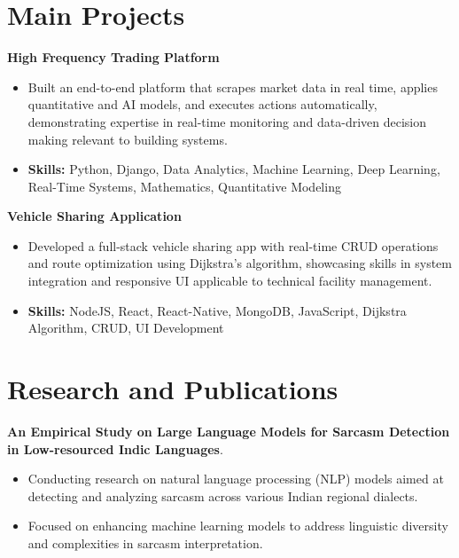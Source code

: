\documentclass[a4paper,11pt]{article}
\begin{document}
\section{\textbf{Main Projects}}

\vspace{1mm}
  \textbf{High Frequency Trading Platform  }
\vspace{-1.5mm} %
\begin{itemize}
  \item Built an end-to-end platform that scrapes market data in real time, applies quantitative and AI models, and executes actions automatically, demonstrating expertise in real-time monitoring and data-driven decision making relevant to building systems.
\vspace{-3mm}
  \item \textbf{Skills:} Python, Django, Data Analytics, Machine Learning, Deep Learning, Real-Time Systems, Mathematics, Quantitative Modeling
\end{itemize}


\vspace{1mm}
   \textbf{Vehicle Sharing Application }
\vspace{-1.5mm} %
\begin{itemize}
  \item Developed a full-stack vehicle sharing app with real-time CRUD operations and route optimization using Dijkstra's algorithm, showcasing skills in system integration and responsive UI applicable to technical facility management.
\vspace{-3mm}
  \item \textbf{Skills:} NodeJS, React, React-Native, MongoDB, JavaScript, Dijkstra Algorithm, CRUD, UI Development
\end{itemize}



\section{\textbf{Research and Publications} \hfill }
\vspace{1mm}
  \textbf{An Empirical Study on Large Language Models for Sarcasm Detection in Low-resourced Indic Languages}.
\vspace{-1mm} %
\begin{itemize}
  \item Conducting research on natural language processing (NLP) models aimed at detecting and analyzing sarcasm across various Indian regional dialects.
\vspace{-3mm}
  \item Focused on enhancing machine learning models to address linguistic diversity and complexities in sarcasm interpretation.
\end{itemize}
\end{document}
